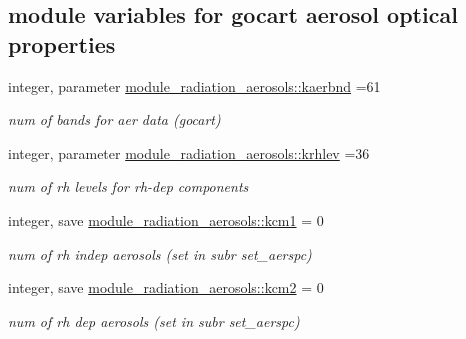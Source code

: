 \subsection*{module variables for gocart aerosol optical properties}
\begin{DoxyCompactItemize}
\item 
\mbox{\label{group__module__radiation__aerosols_gad345c77fc29d8b02de34990162645a66}} 
integer, parameter \hyperlink{group__module__radiation__aerosols_gad345c77fc29d8b02de34990162645a66}{module\+\_\+radiation\+\_\+aerosols\+::kaerbnd} =61
\begin{DoxyCompactList}\small\item\em num of bands for aer data (gocart) \end{DoxyCompactList}\item 
\mbox{\label{group__module__radiation__aerosols_ga33f2d4489a1730a27cbdc2e2add0f977}} 
integer, parameter \hyperlink{group__module__radiation__aerosols_ga33f2d4489a1730a27cbdc2e2add0f977}{module\+\_\+radiation\+\_\+aerosols\+::krhlev} =36
\begin{DoxyCompactList}\small\item\em num of rh levels for rh-\/dep components \end{DoxyCompactList}\item 
\mbox{\label{group__module__radiation__aerosols_ga92b09dd26cc321af3b5da0b1c310a588}} 
integer, save \hyperlink{group__module__radiation__aerosols_ga92b09dd26cc321af3b5da0b1c310a588}{module\+\_\+radiation\+\_\+aerosols\+::kcm1} = 0
\begin{DoxyCompactList}\small\item\em num of rh indep aerosols (set in subr set\+\_\+aerspc) \end{DoxyCompactList}\item 
\mbox{\label{group__module__radiation__aerosols_gab2be28697a95bcec8d5cd8de7ebd4328}} 
integer, save \hyperlink{group__module__radiation__aerosols_gab2be28697a95bcec8d5cd8de7ebd4328}{module\+\_\+radiation\+\_\+aerosols\+::kcm2} = 0
\begin{DoxyCompactList}\small\item\em num of rh dep aerosols (set in subr set\+\_\+aerspc) \end{DoxyCompactList}\item 

\end{DoxyCompactItemize}

